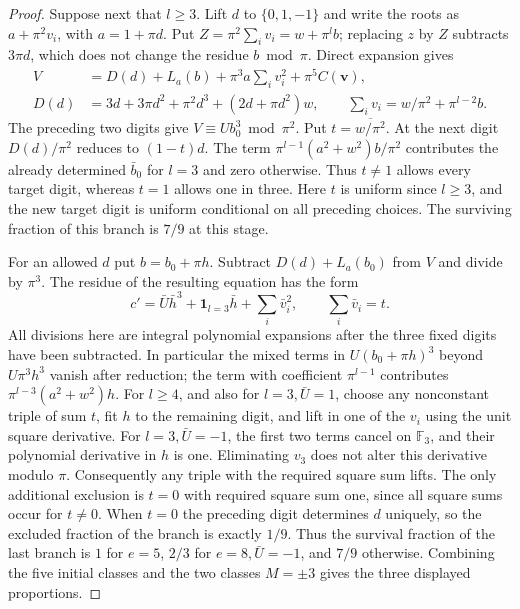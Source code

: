 \documentclass[11pt,letterpaper]{article}
\theoremstyle{definition}
\numberwithin{equation}{section}
\begin{document}
\begin{proof}
Suppose next that $l\ge3$. Lift $d$ to $\{0,1,-1\}$ and write the
roots as $a+\pi^2 v_i$, with $a=1+\pi d$. Put
$Z=\pi^2\sum_i v_i=w+\pi^l b$; replacing $z$ by $Z$ subtracts
$3\pi d$, which does not change the residue $b\bmod\pi$.
Direct expansion gives
\begin{align*}
 V&=D(d)+L_a(b)+\pi^3a\sum_i v_i^2+\pi^5C(\mathbf v),\\
 D(d)&=3d+3\pi d^2+\pi^2d^3+(2d+\pi d^2)w,\qquad
 \sum_i v_i=w/\pi^2+\pi^{l-2}b .
\end{align*}
The preceding two digits give $V\equiv U b_0^3\bmod\pi^2$.
Put $t=\overline{w/\pi^2}$. At the next digit $D(d)/\pi^2$
reduces to $(1-t)d$. The term $\pi^{l-1}(a^2+w^2)b/\pi^2$
contributes the already determined $\bar b_0$ for $l=3$ and zero
otherwise. Thus $t\ne1$ allows every target digit, whereas $t=1$
allows one in three. Here $t$ is uniform since $l\ge3$, and the
new target digit is uniform conditional on all preceding choices.
The surviving fraction of this branch is $7/9$ at this stage.

For an allowed $d$ put $b=b_0+\pi h$. Subtract $D(d)+L_a(b_0)$
from $V$ and divide by $\pi^3$. The residue of the resulting equation
has the form
\[
 c'=\bar U\bar h^3+
       {\boldsymbol 1}_{l=3}\bar h+\sum_i\bar v_i^2,\qquad
                        \sum_i\bar v_i=t .
\]
All divisions here are integral polynomial expansions after the
three fixed digits have been subtracted. In particular the mixed
terms in $U(b_0+\pi h)^3$ beyond $U\pi^3h^3$ vanish after
reduction; the term with coefficient $\pi^{l-1}$ contributes
$\pi^{l-3}(a^2+w^2)h$. For $l\ge4$, and also for $l=3,\bar U=1$,
choose any nonconstant triple of sum $t$, fit $h$ to the remaining
digit, and lift in one of the $v_i$ using the unit square derivative.
For $l=3,\bar U=-1$, the first two terms cancel on $\mathbb F_3$,
and their polynomial derivative in $h$ is one. Eliminating $v_3$
does not alter this derivative modulo $\pi$. Consequently any
triple with the required square sum lifts. The only additional
exclusion is $t=0$ with required square sum one, since all square
sums occur for $t\ne0$. When $t=0$ the preceding digit determines
$d$ uniquely, so the excluded fraction of the branch is exactly
$1/9$. Thus the survival fraction of the last branch is $1$ for
$e=5$, $2/3$ for $e=8,\bar U=-1$, and $7/9$ otherwise.
Combining the five initial classes and the two classes $M=\pm3$
gives the three displayed proportions.
\end{proof}
\end{document}
